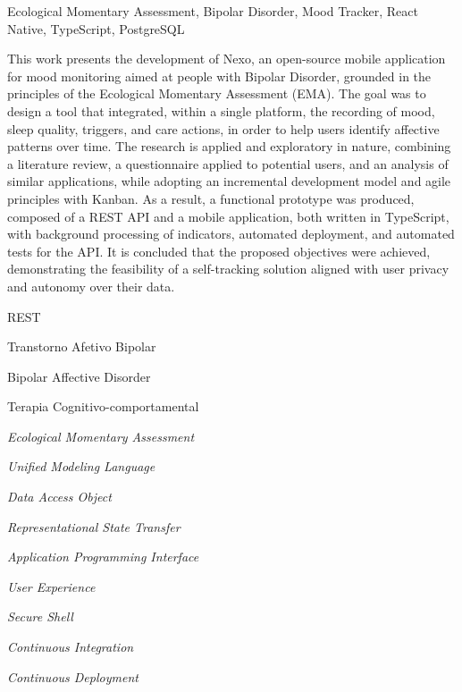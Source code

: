\documentclass[tcc,capa,table]{textsi}
\begin{document}
\begin{englishabstract}%
  {Ecological Momentary Assessment, Bipolar Disorder, Mood Tracker, React
  Native, TypeScript, PostgreSQL}

  \noindent
  This work presents the development of Nexo, an open-source mobile application
  for mood monitoring aimed at people with Bipolar Disorder, grounded in the
  principles of the Ecological Momentary Assessment (EMA). The goal was to
  design a tool that integrated, within a single platform, the recording of
  mood, sleep quality, triggers, and care actions, in order to help users
  identify affective patterns over time. The research is applied and
  exploratory in nature, combining a literature review, a questionnaire applied
  to potential users, and an analysis of similar applications, while adopting
  an incremental development model and agile principles with Kanban. As a
  result, a functional prototype was produced, composed of a REST API and a
  mobile application, both written in TypeScript, with background processing of
  indicators, automated deployment, and automated tests for the API. It is
  concluded that the proposed objectives were achieved, demonstrating the
  feasibility of a self-tracking solution aligned with user privacy and
  autonomy over their data.
\end{englishabstract}

\listoffigures

\listoftables

\lstlistoflistings

\begin{listofabbrv}{REST} %
	\item[TAB] Transtorno Afetivo Bipolar
  \item[BAP] Bipolar Affective Disorder
  \item[TCC] Terapia Cognitivo-comportamental
  \item[EMA] \textit{Ecological Momentary Assessment}
  \item[UML] \textit{Unified Modeling Language}
  \item[DAO] \textit{Data Access Object}
  \item[REST] \textit{Representational State Transfer}
  \item[API] \textit{Application Programming Interface}
  \item[UX] \textit{User Experience}
  \item[SSH] \textit{Secure Shell}
  \item[CI] \textit{Continuous Integration}
  \item[CD] \textit{Continuous Deployment}
\end{listofabbrv}
\end{document}
